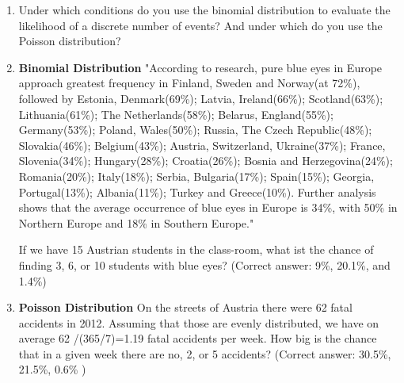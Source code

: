 \begin{enumerate}

    \item Under which conditions do you use the binomial distribution to evaluate the likelihood of a discrete number of events? And under which do you use the Poisson distribution?

    \item \textbf{Binomial Distribution} "According to research, pure blue eyes in Europe approach greatest frequency in Finland, Sweden and Norway(at 72\%), followed by Estonia, Denmark(69\%); Latvia, Ireland(66\%); Scotland(63\%); Lithuania(61\%); The Netherlands(58\%); Belarus, England(55\%); Germany(53\%); Poland, Wales(50\%); Russia, The Czech Republic(48\%); Slovakia(46\%); Belgium(43\%); Austria, Switzerland, Ukraine(37\%); France, Slovenia(34\%); Hungary(28\%); Croatia(26\%); Bosnia and Herzegovina(24\%); Romania(20\%); Italy(18\%); Serbia, Bulgaria(17\%); Spain(15\%); Georgia, Portugal(13\%); Albania(11\%); Turkey and Greece(10\%). Further analysis shows that the average occurrence of blue eyes in Europe is 34\%, with 50\% in Northern Europe and 18\% in Southern Europe."

    If we have 15 Austrian students in the class-room, what ist the chance of finding 3, 6, or 10 students with blue eyes?
    (Correct answer: 9\%, 20.1\%, and 1.4\%)

    \item \textbf{Poisson Distribution} On the streets of Austria there were 62 fatal accidents in 2012. Assuming that those are evenly distributed, we have on average
    62 /(365/7)=1.19 fatal accidents per week. How big is the chance that in a given week there are no, 2, or 5 accidents?
    (Correct answer: 30.5\%, 21.5\%, 0.6\% )
\end{enumerate}
